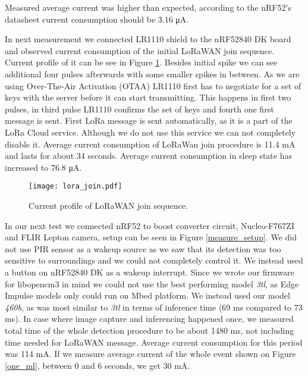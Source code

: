 Measured average current was higher than expected, according to the nRF52's datasheet\cite{nrf52_datasheet} current consumption should be 3.16 \si{\micro\ampere}.

In next measurement we connected LR1110 shield to the nRF52840 DK board and observed current consumption of the initial LoRaWAN join sequence.
Current profile of it can be see in Figure \ref{lora_join}.
Besides initial spike we can see additional four pulses afterwards with some smaller spikes in between. 
As we are using Over-The-Air Activation (OTAA) LR1110 first has to negotiate for a set of keys with the server before it can start transmitting.
This happens in first two pulses, in third pulse LR1110 confirms the set of keys and fourth one first message is sent.
First LoRa message is sent automatically, as it is a part of the LoRa Cloud service.
Although we do not use this service we can not completely disable it.
Average current consumption of LoRaWan join procedure is 11.4 \si{\milli\ampere} and lasts for about 34 seconds.
Average current consumption in sleep state has increased to 76.8 \si{\micro\ampere}.

\begin{figure}[ht]
    \centering
    \texttt{[image: lora\_join.pdf]}
    \caption{ Current profile of LoRaWAN join sequence.}
    \label{lora_join}
\end{figure}

In our next test we connected nRF52 to boost converter circuit, Nucleo-F767ZI and FLIR Lepton camera, setup can be seen in Figure \ref{measure_setup}.
We did not use PIR sensor as a wakeup source as we saw that its detection was too sensitive to surroundings and we could not completely control it.
We instead used a button on nRF52840 DK as a wakeup interrupt.
Since we wrote our firmware for libopencm3 in mind we could not use the best performing model \textit{3tl}, as Edge Impulse models only could run on Mbed platform.
We instead used our model \textit{460b}, as was most similar to \textit{3tl} in terms of inference time (69 \si{\milli\second} compared to 73 \si{\milli\second}).
In case where image capture and inferencing happened once, we measured total time of the whole detection procedure to be about 1480 \si{\milli\second}, not including time needed for LoRaWAN message.
Average current consumption for this period was 114 \si{\milli\ampere}.
If we measure average current of the whole event shown on Figure \ref{one_ml}, between 0 and 6 seconds, we get 30 \si{\milli\ampere}.

